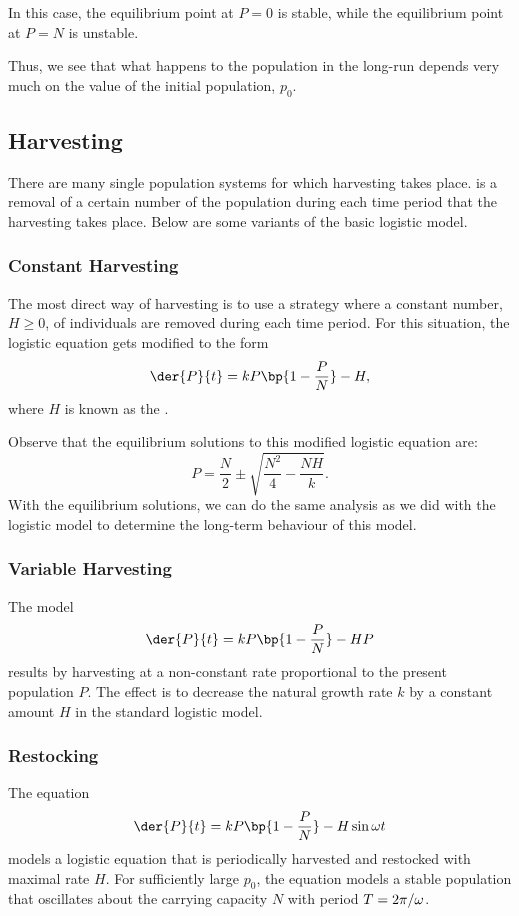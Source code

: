 In this case, the equilibrium point at $P = 0$ is stable, while the equilibrium point at $P = N$ is unstable.

Thus, we see that what happens to the population in the long-run depends very much on the value of the initial population, $p_0$.

\subsection{Harvesting}

There are many single population systems for which harvesting takes place.  is a removal of a certain number of the population during each time period that the harvesting takes place. Below are some variants of the basic logistic model.

\subsubsection{Constant Harvesting}

The most direct way of harvesting is to use a strategy where a constant number, $H \geq 0$, of individuals are removed during each time period. For this situation, the logistic equation gets modified to the form \[\der{P}{t} = kP\bp{1 - \frac{P}{N}} - H,\] where $H$ is known as the .

Observe that the equilibrium solutions to this modified logistic equation are: \[P = \frac{N}{2} \pm \sqrt{\frac{N^2}{4} - \frac{NH}{k}}.\] With the equilibrium solutions, we can do the same analysis as we did with the logistic model to determine the long-term behaviour of this model.

\subsubsection{Variable Harvesting}

The model \[\der{P}{t} = kP \bp{1 - \frac{P}{N}} - HP\] results by harvesting at a non-constant rate proportional to the present population $P$. The effect is to decrease the natural growth rate $k$ by a constant amount $H$ in the standard logistic model.

\subsubsection{Restocking}

The equation \[\der{P}{t} = kP \bp{1 - \frac{P}{N}} - H \sin{\o t}\] models a logistic equation that is periodically harvested and restocked with maximal rate $H$. For sufficiently large $p_0$, the equation models a stable population that oscillates about the carrying capacity $N$ with period $T = 2\pi / \omega$.